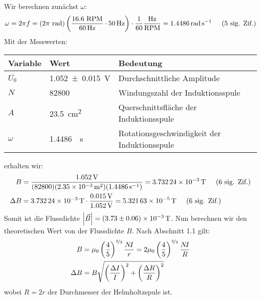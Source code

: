 	Wir berechnen zunächst $\omega$:
	\begin{align}
		\omega = 2 \pi f = (2\pi ~\si{\radian}) \left(\frac{16.6 \text{ RPM}}{\SI{60}{\hertz}} \cdot \SI{50}{\hertz}\right) \cdot \frac{1}{60} \frac{\si{\hertz}}{\text{RPM}} = \SI{1.4486}{\radian\per\second}  \hspace{0.5cm}\text{(5 sig. Zif.)}
	\end{align}
	Mit der Messwerten:
	\begin{center}
		\begin{tabular}{lll}
			\toprule
			Variable & Wert & Bedeutung \\
			\midrule
			$\overline{U_0}$ & \SI{1.052(15)}{\volt} & Durchschnittliche Amplitude \\
			$N$ & \SI{82800}{} & Windungszahl der Induktionsspule \\
			$A$ & \SI{23.5}{\centi\meter\squared} & Querschnittsfläche der Induktionsspule \\
			$\omega$ & \SI{1.4486}{\per\second} & Rotationsgeschwindigkeit der Induktionsspule \\
			\bottomrule
		\end{tabular}
	\end{center}
	erhalten wir:
	\begin{align}
		B &= \frac{\SI{1.052}{\volt}}{(82800)(\SI{2.35e-3}{\meter\squared})(\SI{1.4486}{\per\second})} = \SI{3.73224e-3}{\tesla} \hspace{0.5cm}\text{(6 sig. Zif.)} \\
		\Delta B &= \SI{3.73224e-3}{\tesla} \cdot \frac{\SI{0.015}{\volt}}{\SI{1.052}{\volt}} = \SI{5.32163e-5}{\tesla} \hspace{0.5cm}\text{(6 sig. Zif.)}
	\end{align}
	Somit ist die Flussdichte $\abs{\vec{B}} = \SI{3.73(6)e-3}{\tesla}$.
	\newpage
	Nun berechnen wir den theoretischen Wert von der Flussdichte $B$. Nach Abschnitt 1.1 gilt:
	\begin{align}
		B &= \mu_0 \left(\frac{4}{5}\right)^{\nicefrac{3}{2}} \frac{N\!I}{r} = 2\mu_0 \left(\frac{4}{5}\right)^{\nicefrac{3}{2}} \frac{N\!I}{R} \\
		\Delta B &= B \relquad{I,R}
	\end{align}
	wobei $R = 2r$ der Durchmesser der Helmholtzspule ist. 

